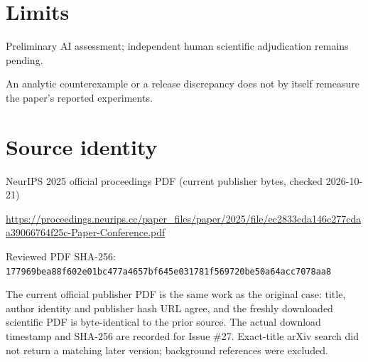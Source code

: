 \documentclass[11pt]{article}
\begin{document}
\section*{Limits}

Preliminary AI assessment; independent human scientific adjudication remains pending.\par

An analytic counterexample or a release discrepancy does not by itself remeasure the paper’s reported experiments.\par

\section*{Source identity}

NeurIPS 2025 official proceedings PDF (current publisher bytes, checked 2026-10-21)

\url{https://proceedings.neurips.cc/paper_files/paper/2025/file/ec2833cda146c277cdaa39066764f25c-Paper-Conference.pdf}

Reviewed PDF SHA-256: \nolinkurl{177969bea88f602e01bc477a4657bf645e031781f569720be50a64acc7078aa8}

The current official publisher PDF is the same work as the original case: title, author identity and publisher hash URL agree, and the freshly downloaded scientific PDF is byte-identical to the prior source. The actual download timestamp and SHA-256 are recorded for Issue \#27. Exact-title arXiv search did not return a matching later version; background references were excluded.
\end{document}
